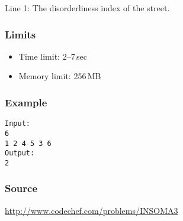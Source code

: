 Line 1: The disorderliness index of the street.

\subsubsection*{Limits}
\begin{itemize}
    \item Time limit: 2--7\,sec
    \item Memory limit: 256\,MB
\end{itemize}

\subsubsection*{Example}
\begin{verbatim}
Input:
6
1 2 4 5 3 6
Output:
2
\end{verbatim}

\subsubsection*{Source} \url{http://www.codechef.com/problems/INSOMA3}

